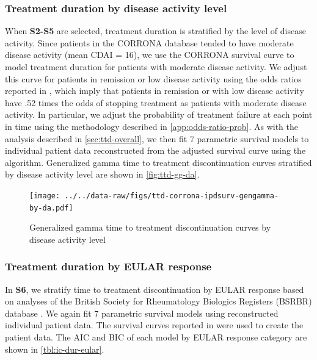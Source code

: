 \documentclass[11pt,final,fleqn]{article}\usepackage[]{graphicx}\usepackage[]{color}
\theoremstyle{plain}
\begin{document}
\subsubsection{Treatment duration by disease activity level}\label{ttd-da}
When \textbf{S2-S5} are selected, treatment duration is stratified by the level of disease activity. Since patients in the CORRONA database tended to have moderate disease activity (mean CDAI = 16), we use the CORRONA survival curve to model treatment duration for patients with moderate disease activity. We adjust this curve for patients in remission or low disease activity using the odds ratios reported in \citet{zhang2011thresholds}, which imply that patients in remission or with low disease activity have .52 times the odds of stopping treatment as patients with moderate disease activity. In particular, we adjust the probability of treatment failure at each point in time using the methodology described in \autoref{app:odds-ratio-prob}. As with the analysis described in \autoref{sec:ttd-overall}, we then fit 7 parametric survival models to individual patient data reconstructed from the adjusted survival curve using the \citet{guyot2012enhanced} algorithm. Generalized gamma time to treatment discontinuation curves stratified by disease activity level are shown in \autoref{fig:ttd-gg-da}.

\begin{figure}[H]
\centering
\texttt{[image: ../../data-raw/figs/ttd-corrona-ipdsurv-gengamma-by-da.pdf]}
\caption{Generalized gamma time to treatment discontinuation curves by disease activity level}\label{fig:ttd-gg-da}
\end{figure}

\subsubsection{Treatment duration by EULAR response} \label{ttd-eular}
In \textbf{S6}, we stratify time to treatment discontinuation by EULAR response based on analyses of the British Society for Rheumatology Biologics Registers (BSRBR) database \citep{stevenson2016adalimumab}. We again fit 7 parametric survival models using reconstructed individual patient data. The survival curves reported in \citet{stevenson2016adalimumab} were used to create the patient data. The AIC and BIC of each model by EULAR response category are shown in \autoref{tbl:ic-dur-eular}.
\end{document}
